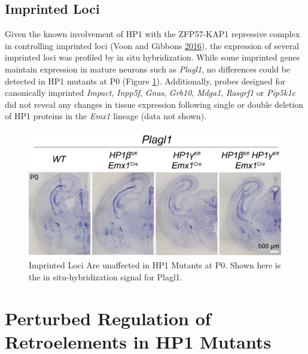 \documentclass[onehalf,12pt]{beavtex}
\begin{document}
  \FloatBarrier
  
  \subsection{Imprinted Loci}\label{imprint}
  
  Given the known involvement of HP1 with the ZFP57-KAP1 repressive
  complex in controlling imprinted loci (Voon and Gibbons
  \protect\hyperlink{ref-VoonMaintainingmemorysilencing2016}{2016}), the
  expression of several imprinted loci was profiled by in situ
  hybridization. While some imprinted genes maintain expression in mature
  neurons such as \emph{Plagl1}, no differences could be detected in HP1
  mutants at P0 (Figure \ref{fig:Plagl1}). Additionally, probes designed
  for canonically imprinted \emph{Impact}, \emph{Inpp5f}, \emph{Gnas},
  \emph{Grb10}, \emph{Mdga1}, \emph{Rasgrf1} or \emph{Pip5k1c} did not
  reveal any changes in tissue expression following single or double
  deletion of HP1 proteins in the \emph{Emx1} lineage (data not shown).
  
  \begin{figure}
  
  {\centering \includegraphics[width=1\linewidth, ]{./figure/results/Plagl1} 
  
  }
  
  \caption[Imprinted Loci Are unaffected in HP1 Mutants at P0]{Imprinted Loci Are unaffected in HP1 Mutants at P0.  Shown here is the in situ-hybridization signal for Plagl1.}\label{fig:Plagl1}
  \end{figure}
  
  \section{Perturbed Regulation of Retroelements in HP1
  Mutants}\label{perturbed-regulation-of-retroelements-in-hp1-mutants}
  
\end{document}
